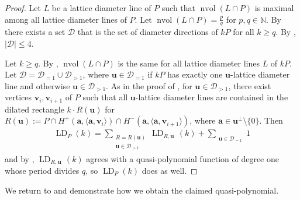 \documentclass[11pt]{article}
\newcommand{\ba}{\mathbf{a}}
\newcommand{\bu}{\mathbf{u}}
\newcommand{\bv}{\mathbf{v}}
\newcommand{\N}{\mathbb{N}}
\newcommand{\Dcal}{\mathcal{D}}
\DeclareMathOperator{\nvol}{nvol}
\DeclareMathOperator{\LD}{LD}
\begin{document}
\begin{proof}
    Let $L$ be a lattice diameter line of $P$ such that $\nvol(L \cap P)$ is maximal among all lattice diameter lines of $P$. Let $\nvol(L \cap P) =\frac{p}{q}$ for $p,q \in \N$. By  there exists a set $\Dcal$ that is the set of diameter directions of $kP$ for all $k\geq q$.
    By \cite[Theorem~4.1]{Alarcon_PhD}, $|\Dcal| \leq 4$.

    Let $k \geq q$. By , $\nvol(L \cap P)$ is the same for all lattice diameter lines $L$ of $kP$. Let $\Dcal = \Dcal_{=1} \cup \Dcal_{>1}$, where $\bu \in \Dcal_{=1}$ if $kP$ has exactly one $\bu$-lattice diameter line and otherwise $\bu \in \Dcal_{>1}$. As in the proof of , for $\bu \in \Dcal_{>1}$, there exist vertices $\bv_i, \bv_{i+1}$ of $P$ such that all $\bu$-lattice diameter lines are contained in the dilated rectangle $k\cdot R(\bu)$ for $R(\bu):=P \cap H^+(\ba,\langle \ba, \bv_i \rangle) \cap H^-(\ba,\langle \ba, \bv_{i+1} \rangle)$, where $\ba \in \bu^{\perp} \setminus \{0\}$. Then
    \begin{align*}
        \LD_P(k) = \sum_{\substack{R = R(\bu) \\ \bu \in \Dcal_{>1}}} \LD_{R,\bu\,}(k) + \sum_{\substack{\bu \in \Dcal_{=1}}} 1
    \end{align*}
    and by , $\LD_{R,\bu\,}(k)$ agrees with a quasi-polynomial function of degree one whose period divides $q$, so $\LD_P(k)$ does as well.
\end{proof}

We return to  and demonstrate how we obtain the claimed quasi-polynomial.
\end{document}
